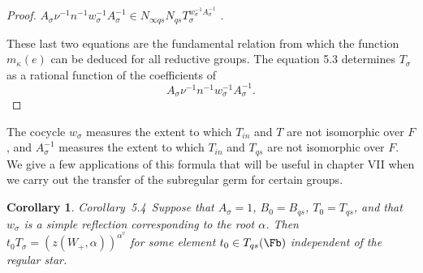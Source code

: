 \documentclass{memo-l}
\newtheorem{corollary}[theorem]{Corollary}
\theoremstyle{definition}
\theoremstyle{remark}
\numberwithin{section}{chapter}
\numberwithin{equation}{chapter}
\begin{document}
\begin{proof}
$A_{{\sigma}}{\nu}^{-1}n^{-1}
w_{{\sigma}}^{-1}A_{{\sigma}}^{-1} \in
N_{{\infty}qs}N_{qs}T_{{\sigma}}^{w_\sigma^{-1}A_\sigma^{-1}}$ .
\enddefinition

These last two equations are the fundamental relation from which the
function $m_{{\kappa}}(e)$ can be deduced for all reductive groups.
The equation 5.3 determines $T_{{\sigma}}$ as a rational function of
the coefficients
of $$A_{{\sigma}}{\nu}^{-1}n^{-1}w_{{\sigma}}^{-1}A_{{\sigma}}^{-1}.$$
\end{proof} 

The cocycle $w_{{\sigma}}$ measures the extent to which $T_{in}$ and
$T$ are not isomorphic over $F$, and $A_{{\sigma}}^{-1}$ measures the
extent to which $T_{in}$ and $T_{qs}$ are not isomorphic over $F$.  We
give a few applications of this formula that will be useful in chapter
VII when we carry out the transfer of the subregular germ for certain
groups.

\medskip

\begin{corollary}{Corollary\ 5.4}\   Suppose that $A_{{\sigma}} = 1$, $B_{0} = B_{qs}$,
$T_{0} = T_{qs}$, and that $w_{{\sigma}}$ is a simple reflection corresponding
to the root ${\alpha}$.
 Then $t_{0}T_{{\sigma}} = (z(W_{+},{\alpha}))^{\alpha^v}$  for some
element $t_{0} \in T_{qs}(\Fb)$ independent of the regular star.
\end{corollary}
\end{document}
